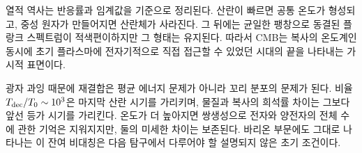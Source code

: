 열적 역사는 반응률과 임계값을 기준으로 정리된다. 산란이 빠르면 공통 온도가 형성되고, 중성 원자가 만들어지면 산란체가 사라진다. 그 뒤에는 균일한 팽창으로 동결된 플랑크 스펙트럼이 적색편이하지만 그 형태는 유지된다. 따라서 CMB는 복사의 온도계인 동시에 초기 플라스마에 전자기적으로 직접 접근할 수 있었던 시대의 끝을 나타내는 가시적 표면이다.

광자 과잉 때문에 재결합은 평균 에너지 문제가 아니라 꼬리 분포의 문제가 된다. 비율 \(T_{\rm dec}/T_0\sim10^3\)은 마지막 산란 시기를 가리키며, 물질과 복사의 희석률 차이는 그보다 앞선 등가 시기를 가리킨다. 온도가 더 높아지면 쌍생성으로 전자와 양전자의 전체 수에 관한 기억은 지워지지만, 둘의 미세한 차이는 보존된다. 바리온 부문에도 그대로 나타나는 이 잔여 비대칭은 다음 탐구에서 다루어야 할 설명되지 않은 초기 조건이다.
